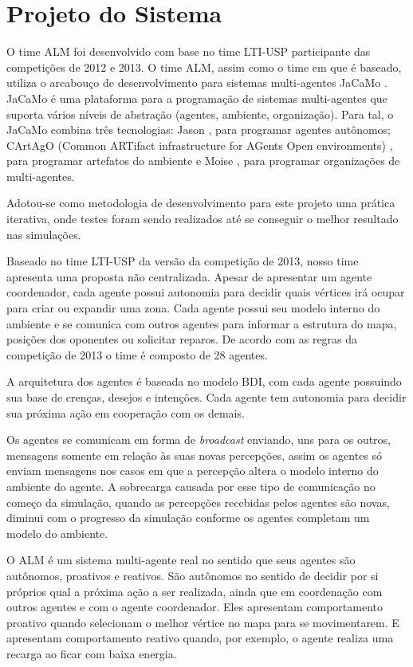 \documentclass{llncs}
\begin{document}
\section{Projeto do Sistema}

O time ALM foi desenvolvido com base no time LTI-USP participante das competições de 2012 e 2013. O time ALM, assim como o time em que é baseado, utiliza o arcabouço de desenvolvimento para sistemas multi-agentes JaCaMo \cite{jacamo-scp78}. JaCaMo é uma plataforma para a programação de sistemas multi-agentes que suporta vários níveis de abstração (agentes, ambiente, organização). Para tal, o JaCaMo combina três tecnologias: Jason \cite{bordini2007jason}, para programar agentes autônomos; CArtAgO (Common ARTifact infrastructure for AGents Open environments) \cite{ricci2011cartago}, para programar artefatos do ambiente e Moise \cite{hubner2010moise}, para programar organizações de multi-agentes.

Adotou-se como metodologia de desenvolvimento para este projeto uma prática iterativa, onde testes foram sendo realizados até se conseguir o melhor resultado nas simulações.

Baseado no time LTI-USP da versão da competição de 2013, nosso time apresenta uma proposta não centralizada. Apesar de apresentar um agente coordenador, cada agente possui autonomia para decidir quais vértices irá ocupar para criar ou expandir uma zona. Cada agente possui seu modelo interno do ambiente e se comunica com outros agentes para informar a estrutura do mapa, posições dos oponentes ou solicitar reparos. De acordo com as regras da competição de 2013 o time é composto de 28 agentes\cite{franco2013improving}.

A arquitetura dos agentes é baseada no modelo BDI, com cada agente possuindo sua base de crenças, desejos e intenções. Cada agente tem autonomia para decidir sua próxima ação em cooperação com os demais.

Os agentes se comunicam em forma de \textit{broadcast} enviando, uns para os outros, mensagens somente em relação às suas novas percepções, assim os agentes só enviam mensagens nos casos em que a percepção altera o modelo interno do ambiente do agente. A sobrecarga causada por esse tipo de comunicação no começo da simulação, quando as percepções recebidas pelos agentes são novas, diminui com o progresso da simulação conforme os agentes completam um modelo do ambiente.

O ALM é um sistema multi-agente real no sentido que seus agentes são autônomos, proativos e reativos. São autônomos no sentido de decidir por si próprios qual a próxima ação a ser realizada, ainda que em coordenação com outros agentes e com o agente coordenador. Eles apresentam comportamento proativo quando selecionam o melhor vértice no mapa para se movimentarem. E apresentam comportamento reativo quando, por exemplo, o agente realiza uma recarga ao ficar com baixa energia.
\end{document}
